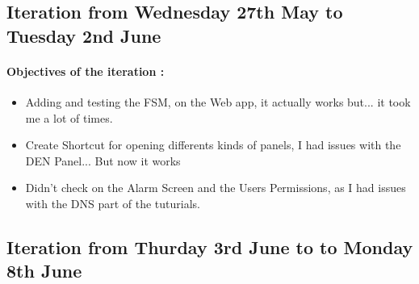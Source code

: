 \documentclass[a4paper, 12pt]{article}
\begin{document}
\begin{appendix}
\subsection{Iteration from Wednesday 27th May to Tuesday 2nd June}
\paragraph{Objectives of the iteration :}
\begin{itemize}
    \item Adding and testing the FSM, on the Web app, it actually works but... it took me a lot of times.
    \item Create Shortcut for opening differents kinds of panels, I had issues with the DEN Panel... But now it works
    \item Didn't check on the Alarm Screen and the Users Permissions, as I had issues with the DNS part of the tuturials.
\end{itemize}

\subsection{Iteration from Thurday 3rd June to to Monday 8th June}

\end{appendix}
\end{document}
